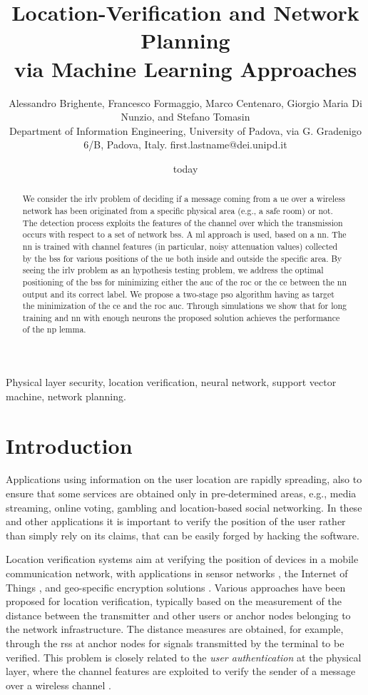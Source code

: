 \documentclass[conference]{IEEEtran}
\title{Location-Verification and Network Planning \\ via Machine Learning Approaches}
\author{Alessandro Brighente, Francesco Formaggio, Marco Centenaro, Giorgio Maria Di Nunzio, and    Stefano Tomasin \\ {\small Department of Information Engineering, University of Padova, via G. Gradenigo 6/B, Padova, Italy. first.lastname@dei.unipd.it} }
\date{today}
\begin{document}
\maketitle

\begin{abstract}
We consider the \ac{irlv} problem of deciding if a message coming from a \ac{ue} over a wireless network has been originated from a specific physical area (e.g., a safe room) or not. The detection process exploits the features of the channel over which the transmission occurs with respect to a set of network \acp{bs}. A  \ac{ml} approach is used, based on a \ac{nn}. The \ac{nn} is trained with channel features (in particular, noisy attenuation values) collected by the \acp{bs} for various positions of the \ac{ue} both inside and outside the specific area. By seeing the \ac{irlv} problem as an hypothesis testing problem, we address the optimal positioning of the \acp{bs} for minimizing either the \ac{auc} of the \ac{roc} or  the \ac{ce} between the \ac{nn} output and its correct label. We propose a two-stage \ac{pso} algorithm having as target the  minimization of  the \ac{ce} and  the \ac{roc} \ac{auc}. Through simulations we show that for long training and \ac{nn} with enough neurons the proposed solution achieves the performance of the \ac{np} lemma.
\end{abstract}

\begin{IEEEkeywords}
Physical layer security, location verification, neural network, support vector machine, network planning.
\end{IEEEkeywords}
\glsresetall

\section{Introduction}

Applications using information on the user  location are rapidly spreading, also to ensure that some services are obtained only in pre-determined areas, e.g., media streaming,  online voting,  gambling and location-based social networking. In these and other applications it is important to verify the position of the user rather than simply rely on its claims, that can be easily forged by hacking the software.

Location verification systems aim at verifying the position of devices in a mobile communication network, with applications in sensor networks \cite{Zeng-survey, 8376254}, the Internet of Things \cite{7903611}, and geo-specific encryption solutions \cite{quaglia}. Various approaches have been proposed for location verification, typically based on the measurement of the distance between the transmitter and other users  or  anchor nodes belonging to the network infrastructure. The distance measures are obtained, for example, through the \ac{rss} at anchor nodes for signals transmitted by the terminal to be verified.  This problem is closely related to the {\em user authentication} at the physical layer, where the channel features are exploited to verify the sender of a message over a wireless channel \cite{7270404}.
\end{document}
